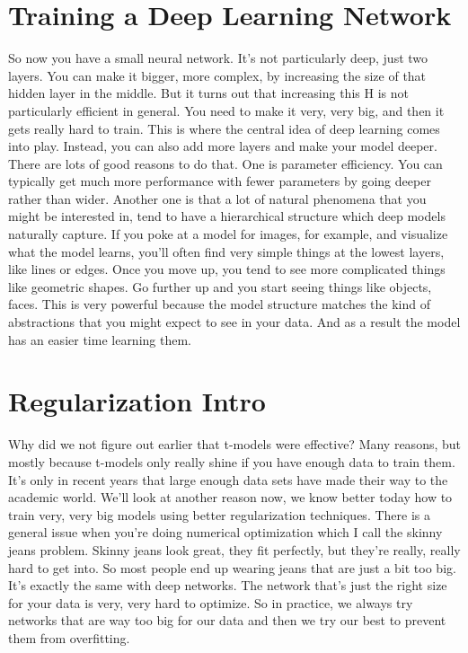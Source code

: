 \documentclass{article}
\begin{document}
\section{Training a Deep Learning Network}
So now you have a small neural network.
It's not particularly deep,
just two layers.
You can make it bigger, more complex,
by increasing the size of that
hidden layer in the middle.
But it turns out that increasing
this H is not particularly
efficient in general.
You need to make it very, very big,
and then it gets really hard to train.
This is where the central idea of
deep learning comes into play.
Instead, you can also add more
layers and make your model deeper.
There are lots of good
reasons to do that.
One is parameter efficiency.
You can typically get much more
performance with fewer parameters
by going deeper rather than wider.
Another one is that a lot of
natural phenomena that you might be
interested in,
tend to have a hierarchical structure
which deep models naturally capture.
If you poke at a model for
images, for example, and
visualize what the model learns,
you'll often find very simple things at
the lowest layers, like lines or edges.
Once you move up,
you tend to see more complicated
things like geometric shapes.
Go further up and you start seeing
things like objects, faces.
This is very powerful because the model
structure matches the kind of
abstractions that you might
expect to see in your data.
And as a result the model has
an easier time learning them.
\section{Regularization Intro}
Why did we not figure out earlier
that t-models were effective?
Many reasons, but mostly because
t-models only really shine if you
have enough data to train them.
It's only in recent years that large
enough data sets have made their way to
the academic world.
We'll look at another reason now,
we know better today how to train very,
very big models using better
regularization techniques.
There is a general issue when you're
doing numerical optimization which I
call the skinny jeans problem.
Skinny jeans look great,
they fit perfectly, but they're really,
really hard to get into.
So most people end up wearing
jeans that are just a bit too big.
It's exactly the same
with deep networks.
The network that's just the right
size for your data is very,
very hard to optimize.
So in practice, we always try networks
that are way too big for our data and
then we try our best to
prevent them from overfitting.
\end{document}

